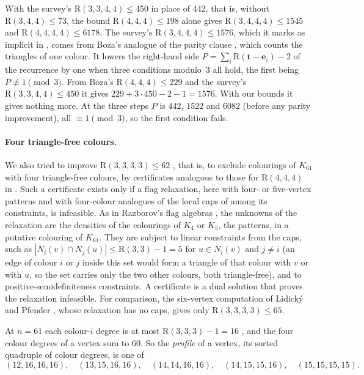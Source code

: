 \documentclass[11pt]{article}
\theoremstyle{spacedplain}
\theoremstyle{spaceddef}
\theoremstyle{spacedremark}
\newcommand{\R}{\mathrm{R}}
\newcommand{\bt}{\mathbf{t}}
\newcommand{\e}{\mathbf{e}}
\begin{document}
With the survey's $\R(3,3,4,4)\le 450$ in place of $442$, that is, without $\R(3,4,4)\le 73$, the bound $\R(4,4,4)\le 198$ alone gives $\R(3,4,4,4)\le 1545$ and $\R(4,4,4,4)\le 6178$.
The survey's $\R(3,4,4,4)\le 1576$, which it marks as implicit in \cite{Boz26}, comes from Boza's analogue of the parity clause \cite[Theorem~2.1]{Boz26}, which counts the triangles of one colour.
It lowers the right-hand side $P=\sum_i\R(\bt-\e_i)-2$ of the recurrence by one when three conditions modulo~$3$ all hold, the first being $P\not\equiv 1\pmod 3$.
From Boza's $\R(4,4,4)\le 229$ and the survey's $\R(3,3,4,4)\le 450$ it gives $229+3\cdot 450-2-1=1576$.
With our bounds it gives nothing more.
At the three steps $P$ is $442$, $1522$ and $6082$ (before any parity improvement), all $\equiv 1\pmod 3$, so the first condition fails.

\paragraph{Four triangle-free colours.}
We also tried to improve $\R(3,3,3,3)\le 62$ \cite{FKR04}, that is, to exclude colourings of $K_{61}$ with four triangle-free colours, by certificates analogous to those for $\R(4,4,4)$ in \cite[Sections~7 and~8]{DC26}.
Such a certificate exists only if a flag relaxation, here with four- or five-vertex patterns and with four-colour analogues of the local caps of \cite[Lemmas~2.1 and~2.3]{DC26} among its constraints, is infeasible.
As in Razborov's flag algebras \cite{Raz07}, the unknowns of the relaxation are the densities of the colourings of $K_4$ or $K_5$, the patterns, in a putative colouring of $K_{61}$.
They are subject to linear constraints from the caps, such as $|N_i(v)\cap N_j(u)|\le\R(3,3)-1=5$ for $u\in N_i(v)$ and $j\ne i$ (an edge of colour $i$ or $j$ inside this set would form a triangle of that colour with $v$ or with $u$, so the set carries only the two other colours, both triangle-free), and to positive-semidefiniteness constraints.
A certificate is a dual solution that proves the relaxation infeasible.
For comparison, the six-vertex computation of Lidick\'y and Pfender \cite[Appendix~A]{LP21}, whose relaxation has no caps, gives only $\R(3,3,3,3)\le 65$.

At $n=61$ each colour-$i$ degree is at most $\R(3,3,3)-1=16$ \cite{GG55}, and the four colour degrees of a vertex sum to $60$.
So the \emph{profile} of a vertex, its sorted quadruple of colour degrees, is one of
\[
(12,16,16,16),\quad (13,15,16,16),\quad (14,14,16,16),\quad (14,15,15,16),\quad (15,15,15,15).
\]
\end{document}
